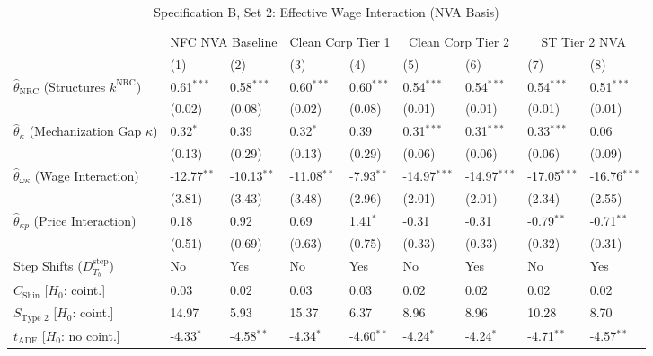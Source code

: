\begin{table}[h!]
	\centering
	\caption{Specification B, Set 2: Effective Wage Interaction (NVA Basis)}
	\label{tab:specB_set2_nva_main}
	\small
	\begin{tabular}{p{3.0cm}p{1.25cm}p{1.25cm}p{1.25cm}p{1.25cm}p{1.5cm}p{1.5cm}p{1.5cm}p{1.5cm}}
		\toprule
		& \multicolumn{2}{c}{NFC NVA Baseline} & \multicolumn{2}{c}{Clean Corp Tier 1} & \multicolumn{2}{c}{Clean Corp Tier 2} & \multicolumn{2}{c}{ST Tier 2 NVA} \\
		\cmidrule(lr){2-3} \cmidrule(lr){4-5} \cmidrule(lr){6-7} \cmidrule(lr){8-9}
		& (1) & (2) & (3) & (4) & (5) & (6) & (7) & (8) \\
		\midrule
		$\hat{\theta}_{\text{NRC}}$  (Structures $k^{\text{NRC}}$) & 0.61$^{***}$ & 0.58$^{***}$ & 0.60$^{***}$ & 0.60$^{***}$ & 0.54$^{***}$ & 0.54$^{***}$ & 0.54$^{***}$ & 0.51$^{***}$ \\
		& (0.02) & (0.08) & (0.02) & (0.08) & (0.01) & (0.01) & (0.01) & (0.01) \\
		$\hat{\theta}_{\kappa}$ (Mechanization Gap $\kappa$) & 0.32$^{*}$ & 0.39 & 0.32$^{*}$ & 0.39 & 0.31$^{***}$ & 0.31$^{***}$ & 0.33$^{***}$ & 0.06 \\
		& (0.13) & (0.29) & (0.13) & (0.29) & (0.06) & (0.06) & (0.06) & (0.09) \\
		$\hat{\theta}_{\omega\kappa}$ (Wage Interaction) & -12.77$^{**}$ & -10.13$^{**}$ & -11.08$^{**}$ & -7.93$^{**}$ & -14.97$^{***}$ & -14.97$^{***}$ & -17.05$^{***}$ & -16.76$^{***}$ \\
		& (3.81) & (3.43) & (3.48) & (2.96) & (2.01) & (2.01) & (2.34) & (2.55) \\
		$\hat{\theta}_{\kappa p}$ (Price Interaction) & 0.18 & 0.92 & 0.69 & 1.41$^{*}$ & -0.31 & -0.31 & -0.79$^{**}$ & -0.71$^{**}$ \\
		& (0.51) & (0.69) & (0.63) & (0.75) & (0.33) & (0.33) & (0.32) & (0.31) \\
		\midrule
		Step Shifts ($D_{T_b}^{\text{step}}$) & No & Yes & No & Yes & No & Yes & No & Yes \\
		$C_{\text{Shin}}$ [$H_0$: coint.] & 0.03 & 0.02 & 0.03 & 0.03 & 0.02 & 0.02 & 0.02 & 0.02 \\
		$S_{\text{Type 2}}$ [$H_0$: coint.] & 14.97 & 5.93 & 15.37 & 6.37 & 8.96 & 8.96 & 10.28 & 8.70 \\
		$t_{\text{ADF}}$ [$H_0$: no coint.] & -4.33$^{*}$ & -4.58$^{**}$ & -4.34$^{*}$ & -4.60$^{**}$ & -4.24$^{*}$ & -4.24$^{*}$ & -4.71$^{**}$ & -4.57$^{**}$ \\

\end{tabular}
\end{table}
